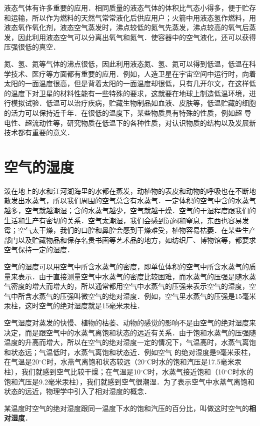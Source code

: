 液态气体有许多重要的应用．相同质量的液态气体的体积比气态小得多，便于贮存和运输，所以作为燃料的天然气常常液化后供应用户；火箭中用液态氢作燃料，用液态氧作氧化剂，液态空气蒸发时，沸点较低的氮气先蒸发，沸点较高的氧气后蒸发，因此利用液态空气可以分离出氧气和氮气．使容器中的空气液化，还可以获得压强很低的真空．

氮、氢、氦等气体的沸点很低，因此利用液态氮、氢、氦可以得到低温，低温在科学技术、医疗等方面都有重要的应用．例如，人造卫星在宇宙空间中运行时，向着太阳的一面温度很高，但是背着太阳的一面温度却很低，只有几开尔文，在这样低的温度下对卫星的材料性能有一些特殊的要求，这就要在地球上制造低温环境，进行模拟试验．低温可以治疗疾病，贮藏生物制品如血液、皮肤等，低温贮藏的细胞的活力可以保持近千年．在很低的温度下，某些物质具有特殊的性质，例如超
导电性、超流动性等，研究物质在低温下的各种性质，对认识物质的结构以及发展新技术都有重要的意义．

\section{空气的湿度}
泼在地上的水和江河湖海里的水都在蒸发，动植物的表皮和动物的呼吸也在不断地散发出水蒸气，所以我们周围的空气总含有水蒸气．一定体积的空气中含的水蒸气越多，空气就越潮湿；含的水蒸气越少，空气就越干燥．空气的干湿程度跟我们的生活和生产有密切的关系．空气太潮湿，我们会感到沉闷和窒息，东西也容易发霉；空气太干燥，我们的口腔和鼻腔会感到干燥难受，植物容易枯萎．在某些生产部门以及贮藏物品和保存名贵书画等艺术品的地方，如纺织厂、博物馆等，都要求空气保持一定的湿度．

空气的湿度可以用空气中所含水蒸气的密度，即单位体积的空气中所含水蒸气的质量来表示．由于直接测量空气中水蒸气的密度比较困难，而水蒸气的压强是随水蒸气密度的增大而增大的，所以通常都用空气中水蒸气的压强来表示空气的湿度，空气中所含水蒸气的压强叫微空气的绝对湿度．例如，空气里水蒸气的压强是15毫米汞柱，这时空气的绝对湿度就是15毫米汞柱．

空气湿度对蒸发的快慢、植物的枯萎、动物的感觉的影响不是由空气的绝对湿度来决定，而是跟空气中的水蒸气离饱和状态的远近有关系．由于饱和水蒸气的压强随温度的升高而增大，所以在空气的绝对湿度一定的情况下，气温高时，水蒸气离饱和状态远；气温低时，水蒸气离饱和状态近．例如空气
的绝对湿度是9毫米汞柱，在气温是20$^\circ$C时，水燕气离饱和状态较远（20$^\circ$C时水的饱和汽压是17.5毫米汞柱），我们就感到空气比较干燥；在气温是10$^\circ$C时，水蒸气接近饱和（10$^\circ$C时水的饱和汽压是9.2毫米汞柱），我们就感到空气很潮湿．为了表示空气中水蒸气离饱和状态的远近，物理学中引入了相对湿度的概念．

某温度时空气的绝对湿度跟同一温度下水的饱和汽压的百分比，叫做这时空气的\textbf{相对湿度}．

